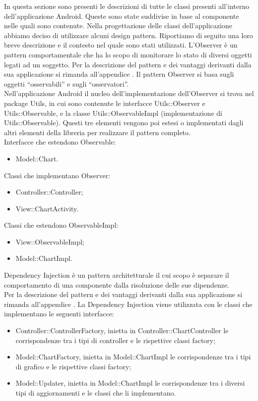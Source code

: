 		In questa sezione sono presenti le descrizioni di tutte le classi presenti all'interno dell'applicazione Android. Queste sono state suddivise in base al componente nelle quali sono contenute.
Nella progettazione delle classi dell'applicazione abbiamo deciso di utilizzare alcuni design pattern. Riportiamo di seguito una loro breve descrizione e il contesto nel quale sono stati utilizzati.
	L'Observer è un pattern comportamentale che ha lo scopo di monitorare lo stato di diversi oggetti legati ad un soggetto.
	Per la descrizione del pattern e dei vantaggi derivanti dalla sua applicazione si rimanda all'appendice .
	Il pattern Observer si basa sugli oggetti “osservabili” e sugli “osservatori”. \\ Nell'applicazione Android il nucleo dell'implementazione dell'Observer si trova nel package Utils, in cui sono contenute le interfacce Utils::Observer e Utils::Observable, e la classe Utils::ObservableImpl (implementazione di Utils::Observable). Questi tre elementi vengono poi estesi o implementati dagli altri elementi della libreria per realizzare il pattern completo.\\
	Interfacce che estendono Observable:
	\begin{itemize}
	\item Model::Chart.
	\end{itemize}
	Classi che implementano Observer:
	\begin{itemize}
	\item Controller::Controller;
	\item View::ChartActivity.
	\end{itemize}
	Classi che estendono ObservableImpl:
	\begin{itemize}
	\item View::ObservableImpl;
	\item Model::ChartImpl.
	\end{itemize}
	Dependency Injection è un pattern architetturale il cui scopo è separare il comportamento di una componente dalla risoluzione delle sue dipendenze.\\
	Per la descrizione del pattern e dei vantaggi derivanti dalla sua applicazione si rimanda all'appendice .
	La Dependency Injection viene utilizzata con le classi che implementano le seguenti interfacce:
	\begin{itemize}
	\item Controller::ControllerFactory, inietta in Controller::ChartController le corrispondenze tra i tipi di controller e le rispettive classi factory;
	\item Model::ChartFactory, inietta in Model::ChartImpl le  corrispondenze tra i tipi di grafico e le rispettive classi factory;
	\item Model::Updater, inietta in Model::ChartImpl le corrispondenze tra i diversi tipi di aggiornamenti e le classi che li implementano.
	\end{itemize}
